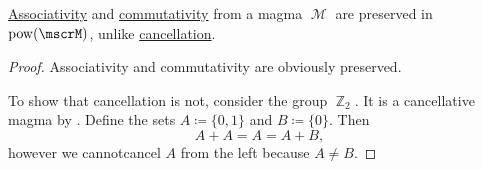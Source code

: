 \begin{proposition}\label{thm:power_set_magma_preservation}
  \hyperref[def:magma/associative]{Associativity} and \hyperref[def:magma/commutative]{commutativity} from a magma \( \mscrM \) are preserved in \( \Pow(\mscrM) \), unlike \hyperref[def:magma/cancellative]{cancellation}.
\end{proposition}
\begin{proof}
  Associativity and commutativity are obviously preserved.

  To show that cancellation is not, consider the group \hyperref[def:group_of_integers_modulo]{\( \BbbZ_2 \)}. It is a cancellative magma by . Define the sets \( A \coloneqq \{ 0, 1 \} \) and \( B \coloneqq \{ 0 \} \). Then
  \begin{equation*}
    A + A = A = A + B,
  \end{equation*}
  however we cannot\LEM cancel \( A \) from the left because \( A \neq B \).
\end{proof}

